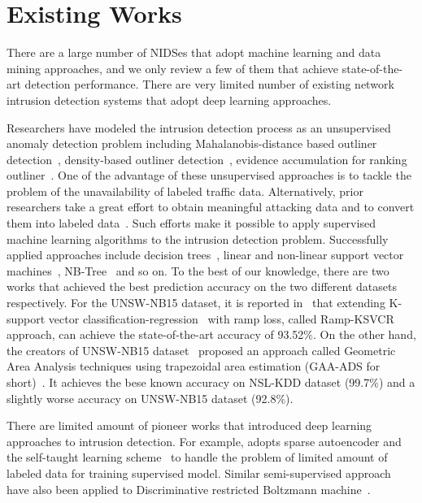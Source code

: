 \section{Existing Works}
There are a large number of NIDSes that adopt machine learning and data mining approaches,
and we only review a few of them that achieve state-of-the-art detection performance.
There are very limited number of existing network intrusion detection systems that adopt
deep learning approaches.

Researchers have modeled the intrusion detection process as an unsupervised
anomaly detection problem including Mahalanobis-distance based outliner detection~\cite{ComparativeAnomalyNIDS}, density-based outliner detection~\cite{LOF, ComparativeAnomalyNIDS},
evidence accumulation for ranking outliner~\cite{RankingOutliner}.
One of the advantage of these unsupervised approaches is to tackle the problem of
the unavailability of labeled traffic data.
Alternatively, prior researchers take a great effort to obtain meaningful
attacking data and to convert them into labeled data~\cite{DARPA, KDDCup, NSL-KDD, UNSW, UNSW1}.
Such efforts make it possible to apply supervised machine learning algorithms to the
intrusion detection problem.
Successfully applied approaches include decision trees~\cite{DecisionTree},
linear and non-linear support vector machines~\cite{SVM}, NB-Tree~\cite{NB-Tree} and so on.
To the best of our knowledge, there are two works that achieved the best prediction
accuracy on the two different datasets respectively.
For the UNSW-NB15 dataset, it is reported in~\cite{RampLossKSVCR} that extending K-support vector
classification-regression~\cite{KSVCR} with ramp loss, called Ramp-KSVCR approach, can achieve the state-of-the-art accuracy of 93.52\%.
On the other hand, the creators of UNSW-NB15 dataset~\cite{UNSW} proposed an approach called
Geometric Area Analysis techniques using trapezoidal area estimation (GAA-ADS for short)~\cite{GAA-ADS}.
It achieves the bese known accuracy on NSL-KDD dataset (99.7\%) and
a slightly worse accuracy on UNSW-NB15 dataset (92.8\%).

There are limited amount of pioneer works that introduced deep learning approaches to intrusion detection.
For example, \cite{STL-NIDS} adopts sparse autoencoder and the self-taught learning
scheme~\cite{SparseAE} to handle the problem of limited amount of labeled data for training supervised model.
Similar semi-supervised approach have also been applied to
Discriminative restricted Boltzmann machine~\cite{AnomalyDetectionRBM}.
